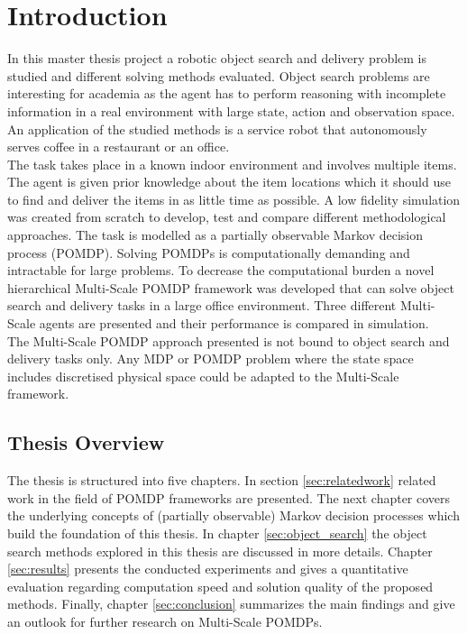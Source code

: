 \chapter{Introduction}
\label{sec:introduction}

In this master thesis project a robotic object search and delivery problem is studied and different solving methods evaluated. Object search problems are interesting for academia as the agent has to perform reasoning with incomplete information in a real environment with large state, action and observation space. An application of the studied methods is a service robot that autonomously serves coffee in a restaurant or an office.  \\

The task takes place in a known indoor environment and involves multiple items. The agent is given prior knowledge about the item locations which it should use to find and deliver the items in as little time as possible. A low fidelity simulation was created from scratch to develop, test and compare different methodological approaches. The task is modelled as a partially observable Markov decision process (POMDP). Solving POMDPs is computationally demanding and intractable for large problems. To decrease the computational burden a novel hierarchical Multi-Scale POMDP framework was developed that can solve object search and delivery tasks in a large office environment. Three different Multi-Scale agents are presented and their performance is compared in simulation.\\

The Multi-Scale POMDP approach presented is not bound to object search and delivery tasks only. Any MDP or POMDP problem where the state space includes discretised physical space could be adapted to the Multi-Scale framework. 



\section{Thesis Overview}
The thesis is structured into five chapters. In section \ref{sec:relatedwork} related work in the field of POMDP frameworks are presented. The next chapter covers the underlying concepts of (partially observable) Markov decision processes which build the foundation of this thesis. In chapter \ref{sec:object_search} the object search methods explored in this thesis are discussed in more details. Chapter \ref{sec:results} presents the conducted experiments and gives a quantitative evaluation regarding computation speed and solution quality of the proposed methods. Finally, chapter \ref{sec:conclusion} summarizes the main findings and give an outlook for further research on Multi-Scale POMDPs. 


